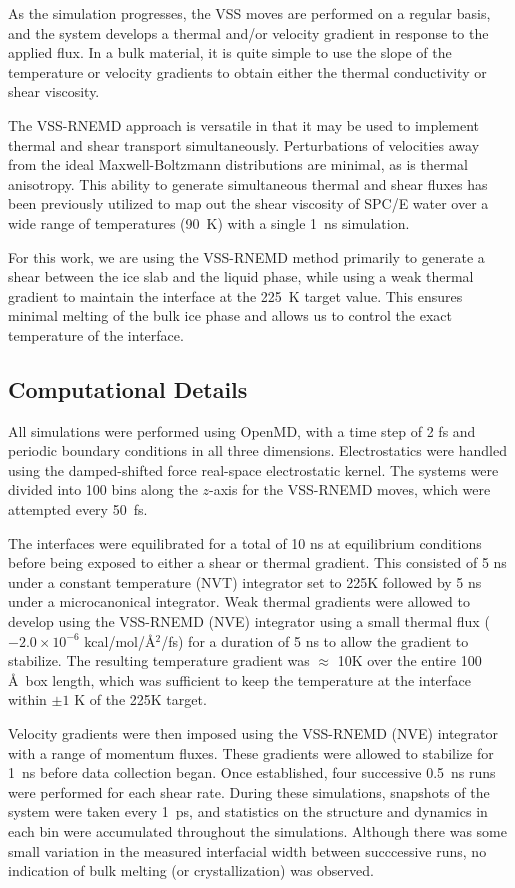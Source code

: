 As the simulation progresses, the VSS moves are performed on a regular
basis, and the system develops a thermal and/or velocity gradient in
response to the applied flux.  In a bulk material, it is quite simple
to use the slope of the temperature or velocity gradients to obtain
either the thermal conductivity or shear viscosity.

The VSS-RNEMD approach is versatile in that it may be used to
implement thermal and shear transport simultaneously.  Perturbations
of velocities away from the ideal Maxwell-Boltzmann distributions are
minimal, as is thermal anisotropy.  This ability to generate
simultaneous thermal and shear fluxes has been previously utilized to
map out the shear viscosity of SPC/E water over a wide range of
temperatures (90~K) with a single 1~ns simulation.\cite{Kuang12}

For this work, we are using the VSS-RNEMD method primarily to generate
a shear between the ice slab and the liquid phase, while using a weak
thermal gradient to maintain the interface at the 225~K target
value. This ensures minimal melting of the bulk ice phase and allows
us to control the exact temperature of the interface.

\subsection{Computational Details}
All simulations were performed using OpenMD,\cite{OOPSE,openmd} with a
time step of 2 fs and periodic boundary conditions in all three
dimensions.  Electrostatics were handled using the damped-shifted
force real-space electrostatic kernel.\cite{Ewald} The systems were
divided into 100 bins along the $z$-axis for the VSS-RNEMD moves,
which were attempted every 50~fs. 

The interfaces were equilibrated for a total of 10 ns at equilibrium
conditions before being exposed to either a shear or thermal gradient.
This consisted of 5 ns under a constant temperature (NVT) integrator
set to 225K followed by 5 ns under a microcanonical integrator.  Weak
thermal gradients were allowed to develop using the VSS-RNEMD (NVE)
integrator using a small thermal flux ($-2.0\times 10^{-6}$
kcal/mol/\AA$^2$/fs) for a duration of 5 ns to allow the gradient to
stabilize.  The resulting temperature gradient was $\approx$ 10K over
the entire 100 \AA\  box length, which was sufficient to keep the
temperature at the interface within $\pm 1$ K of the 225K target.

Velocity gradients were then imposed using the VSS-RNEMD (NVE)
integrator with a range of momentum fluxes.  These gradients were
allowed to stabilize for 1~ns before data collection began. Once
established, four successive 0.5~ns runs were performed for each shear
rate.  During these simulations, snapshots of the system were taken
every 1~ps, and statistics on the structure and dynamics in each bin
were accumulated throughout the simulations.  Although there was some
small variation in the measured interfacial width between succcessive
runs, no indication of bulk melting (or crystallization) was observed.


